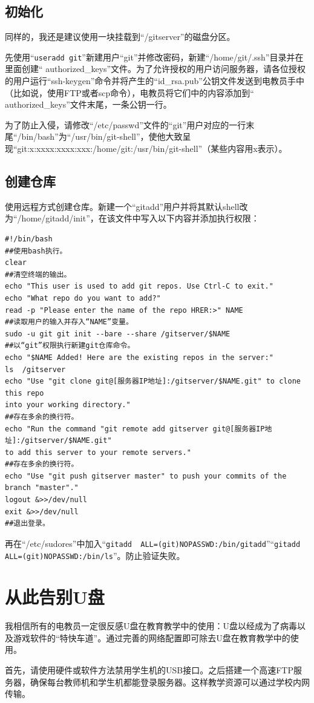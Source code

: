 \subsection{初始化}
同样的，我还是建议使用一块挂载到“/gitserver”的磁盘分区。\par
先使用“\verb|useradd git|”新建用户“git”并修改密码，新建“/home/git/.ssh”目录并在里面创建“ authorized\_keys”文件。为了允许授权的用户访问服务器，请各位授权的用户运行“ssh-keygen”命令并将产生的“id\_rsa.pub”公钥文件发送到电教员手中（比如说，使用FTP或者scp命令），电教员将它们中的内容添加到“ authorized\_keys”文件末尾，一条公钥一行。\par
为了防止入侵，请修改“/etc/passwd”文件的“git”用户对应的一行末尾“/bin/bash”为“/usr/bin/git-shell”，使他大致呈现“git:x:xxxx:xxxx:xxx:/home/git:/usr/bin/git-shell”（某些内容用x表示）。
\subsection{创建仓库}
使用远程方式创建仓库。新建一个“gitadd”用户并将其默认shell改为“/home/gitadd/init”，在该文件中写入以下内容并添加执行权限：
\begin{verbatim}
#!/bin/bash
##使用bash执行。
clear
##清空终端的输出。
echo "This user is used to add git repos. Use Ctrl-C to exit."
echo "What repo do you want to add?"
read -p "Please enter the name of the repo HRER:>" NAME
##读取用户的输入并存入“NAME”变量。
sudo -u git git init --bare --share /gitserver/$NAME
##以“git”权限执行新建git仓库命令。
echo "$NAME Added! Here are the existing repos in the server:"
ls  /gitserver
echo "Use "git clone git@[服务器IP地址]:/gitserver/$NAME.git" to clone this repo 
into your working directory."
##存在多余的换行符。
echo "Run the command "git remote add gitserver git@[服务器IP地址]:/gitserver/$NAME.git" 
to add this server to your remote servers."
##存在多余的换行符。
echo "Use "git push gitserver master" to push your commits of the branch "master"."
logout &>>/dev/null
exit &>>/dev/null
##退出登录。
\end{verbatim}
再在“/etc/sudores”中加入“\verb|gitadd  ALL=(git)NOPASSWD:/bin/gitadd|”“\verb|gitadd  ALL=(git)NOPASSWD:/bin/ls|”。防止验证失败。
\section{从此告别U盘}
我相信所有的电教员一定很反感U盘在教育教学中的使用：U盘以经成为了病毒以及游戏软件的“特快车道”。通过完善的网络配置即可除去U盘在教育教学中的使用。\par
首先，请使用硬件或软件方法禁用学生机的USB接口。之后搭建一个高速FTP服务器，确保每台教师机和学生机都能登录服务器。这样教学资源可以通过学校内网传输。